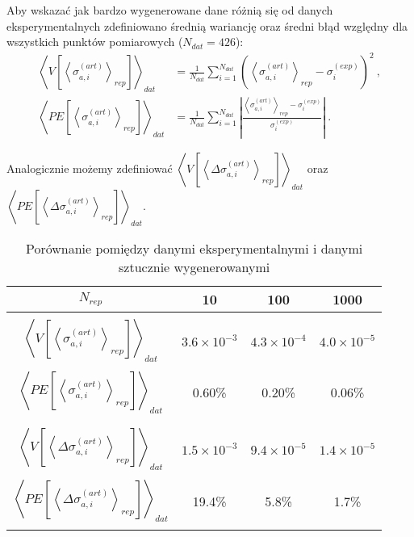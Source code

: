 \documentclass[11pt]{book}
\theoremstyle{definition}
\begin{document}
%
Aby wskazać jak bardzo wygenerowane dane różnią się od danych eksperymentalnych zdefiniowano średnią wariancję oraz średni błąd względny dla wszystkich punktów pomiarowych ($N_{dat} = 426$):
\begin{subequations}
	\begin{align}
	\left \langle V	\left[ \left \langle \sigma_{a,i}^{(art)} \right \rangle_{rep} \right] \right \rangle_{dat} &= \frac{1}{N_{dat}} \sum_{i=1}^{N_{dat}} \left( \left\langle \sigma_{a,i}^{(art)} \right\rangle_{rep} - \sigma_i^{(exp)}  \right)^2 ~,
	\label{eq_var} \\
	\left \langle PE	\left[ \left \langle \sigma_{a,i}^{(art)} \right \rangle_{rep} \right] \right \rangle_{dat} &= \frac{1}{N_{dat}} \sum_{i=1}^{N_{dat}} \left| \frac{\left\langle \sigma_{a,i}^{(art)} \right\rangle_{rep} - \sigma_i^{(exp)}}{\sigma_i^{(exp)}}  \right| ~.
	\label{eq_pe}
	\end{align}
\end{subequations}

Analogicznie możemy zdefiniować $\left \langle V	\left[ \left \langle \Delta \sigma_{a,i}^{(art)} \right \rangle_{rep} \right] \right \rangle_{dat}$ oraz $\left \langle PE	\left[ \left \langle \Delta \sigma_{a,i}^{(art)} \right \rangle_{rep} \right] \right \rangle_{dat}$.


\begin{table}
	\centering
	\caption{Porównanie pomiędzy danymi eksperymentalnymi i danymi sztucznie wygenerowanymi}\label{tab:nrep} 
	
	\begin{tabular}{c|c c c}
		\hline 
		$N_{rep}$ & 10 & 100 & 1000 \\\hline
		\\
		$ \left \langle V	\left[ \left \langle \sigma_{a,i}^{(art)} \right \rangle_{rep} \right] \right \rangle_{dat} $ & $3.6 \times 10^{-3}$ & $4.3 \times 10^{-4}$ & $4.0 \times 10^{-5}$  \\ \\
		$ \left \langle PE	\left[ \left \langle \sigma_{a,i}^{(art)} \right \rangle_{rep} \right] \right \rangle_{dat} $ & 0.60\% & 0.20\% & 0.06\%  \\ 
		\\ \hline \\
		$ \left \langle V	\left[ \left \langle \Delta \sigma_{a,i}^{(art)} \right \rangle_{rep} \right] \right \rangle_{dat} $ & $1.5 \times 10^{-3}$ & $9.4 \times 10^{-5}$ & $1.4 \times 10^{-5}$   \\ \\
		$ \left \langle PE	\left[ \left \langle \Delta \sigma_{a,i}^{(art)} \right \rangle_{rep} \right] \right \rangle_{dat} $ & 19.4\% & 5.8\% & 1.7\%  \\ \\ \hline


	\end{tabular}
\end{table}
\end{document}
